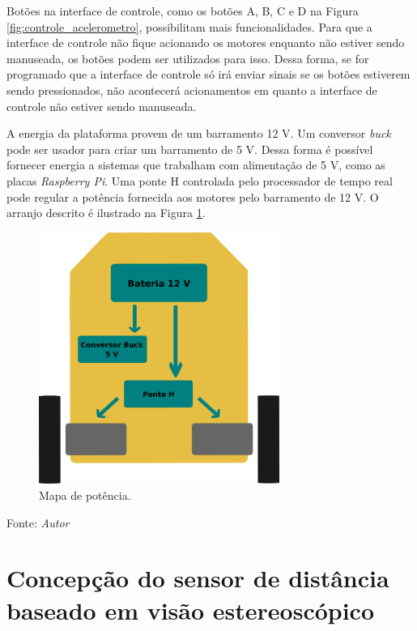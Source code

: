 Botões na interface de controle, como os botões A, B, C e D na Figura \ref{fig:controle_acelerometro}, possibilitam mais funcionalidades.
Para que a interface de controle não fique acionando os motores enquanto não estiver sendo manuseada, os botões podem ser utilizados para isso. Dessa forma, se for programado que a interface de controle só irá enviar sinais se os botões estiverem sendo pressionados, não acontecerá acionamentos em quanto a interface de controle não estiver sendo manuseada.

\pagebreak

A energia da plataforma provem de um barramento 12 V. Um conversor \textit{buck} pode ser usador para criar um barramento de 5 V. Dessa forma é possível fornecer energia a sistemas que trabalham com alimentação de 5 V, como as placas \textit{Raspberry Pi}. 
Uma ponte H controlada pelo processador de tempo real pode regular a potência fornecida aos motores pelo barramento de 12 V. O arranjo descrito é ilustrado na Figura \ref{fig:mapa_pot}.  

\begin{figure}[!htb]
  \centering
  \caption{Mapa de potência.}
  \label{fig:mapa_pot}
  \includegraphics[width=0.7\textwidth]{./img/concepcao/mapa_pot.png}
\end{figure}
Fonte: \textit{Autor}

\pagebreak

\section{Concepção do sensor de distância baseado em visão estereoscópico}


